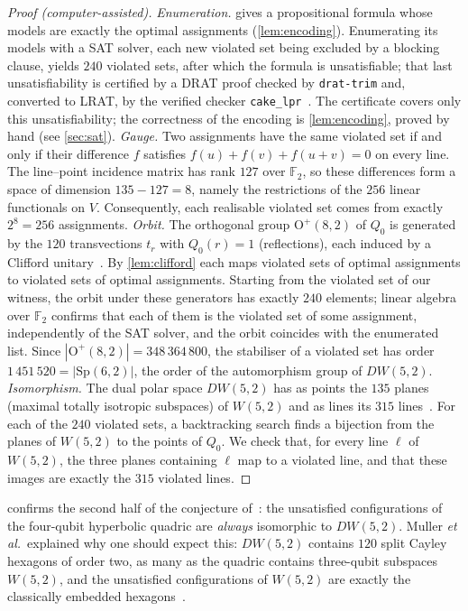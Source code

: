 \documentclass[11pt]{article}
\theoremstyle{definition}
\theoremstyle{remark}
\newcommand{\F}{\mathbb{F}}
\newcommand{\Sp}{\mathrm{Sp}}
\newcommand{\GO}{\mathrm{O}}
\begin{document}
\begin{proof}[Proof (computer-assisted)]
\emph{Enumeration.}  gives a propositional formula whose models are exactly the optimal assignments (\cref{lem:encoding}). Enumerating its models with a SAT solver, each new violated set being excluded by a blocking clause, yields $240$ violated sets, after which the formula is unsatisfiable; that last unsatisfiability is certified by a DRAT proof checked by \texttt{drat-trim} and, converted to LRAT, by the verified checker \texttt{cake\_lpr}~\cite{cakeLPR}. The certificate covers only this unsatisfiability; the correctness of the encoding is \cref{lem:encoding}, proved by hand (see \cref{sec:sat}).
\emph{Gauge.}
Two assignments have the same violated set if and only if their difference $f$ satisfies $f(u)+f(v)+f(u+v)=0$ on every line.
The line--point incidence matrix has rank $127$ over $\F_2$, so these differences form a space of dimension $135-127=8$, namely the restrictions of the $256$ linear functionals on $V$.
Consequently, each realisable violated set comes from exactly $2^8=256$ assignments.
\emph{Orbit.}
The orthogonal group $\GO^+(8,2)$ of $Q_0$ is generated by the $120$ transvections $t_r$ with $Q_0(r)=1$ (reflections), each induced by a Clifford unitary~\cite{Taylor92}.
By \cref{lem:clifford} each maps violated sets of optimal assignments to violated sets of optimal assignments.
Starting from the violated set of our witness, the orbit under these generators has exactly $240$ elements; linear algebra over $\F_2$ confirms that each of them is the violated set of some assignment, independently of the SAT solver, and the orbit coincides with the enumerated list.
Since $|\GO^+(8,2)|=348\,364\,800$, the stabiliser of a violated set has order $1\,451\,520=|\Sp(6,2)|$, the order of the automorphism group of $DW(5,2)$.
\emph{Isomorphism.}
The dual polar space $DW(5,2)$ has as points the $135$ planes (maximal totally isotropic subspaces) of $W(5,2)$ and as lines its $315$ lines~\cite{DeBruyn06}.
For each of the $240$ violated sets, a backtracking search finds
a bijection from the planes of $W(5,2)$ to the points of $Q_0$.
We check that, for every line $\ell$ of $W(5,2)$, the three
planes containing $\ell$ map to a violated line, and that these
images are exactly the $315$ violated lines.
\end{proof}

 confirms the second half of the conjecture of~\cite{Muller24}: the unsatisfied configurations of the four-qubit hyperbolic quadric are \emph{always} isomorphic to $DW(5,2)$.
Muller \emph{et al.}\ explained why one should expect this: $DW(5,2)$ contains $120$ split Cayley hexagons of order two, as many as the quadric contains three-qubit subspaces $W(5,2)$, and the unsatisfied configurations of $W(5,2)$ are exactly the classically embedded hexagons~\cite{Muller24,Saniga24hex}.
\end{document}
